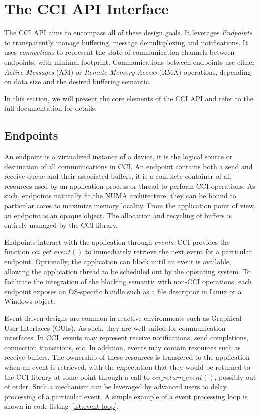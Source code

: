 \section{The CCI API Interface}
\label{sec:interface}

The CCI API aims to encompass all of these design goals. It leverages \emph{Endpoints} to transparently manage buffering, message demultiplexing and notifications. It uses \emph{connections} to represent the state of communication channels between endpoints, with minimal footprint. Communications between endpoints use either \emph{Active Messages} (AM) or \emph{Remote Memory Access} (RMA) operations, depending on data size and the desired buffering semantic. 

In this section, we will present the core elements of the CCI API and refer to the full documentation\cite{cci-api} for details.

\subsection{Endpoints}
An endpoint is a virtualized instance of a device, it is the logical source 
or destination of all communications in CCI. An endpoint contains both a send 
and receive queue and their associated buffers, it is a complete container 
of all resources used by an application process or thread to perform CCI 
operations. As such, endpoints naturally fit the NUMA architecture, they can 
be bound to particular cores to maximize memory locality. From the application 
point of view, an endpoint is an opaque object. The allocation and recycling 
of buffers is entirely managed by the CCI library.

Endpoints interact with the application through \emph{events}. CCI provides the function $cci\_get\_event()$ to immediately retrieve the next event for a particular endpoint. Optionally, the application can block until an event is available, allowing the application thread to be scheduled out by the operating system. To facilitate the integration of the blocking semantic with non-CCI operations, each endpoint exposes an OS-specific handle such as a file descriptor in Linux or a Windows object. 

Event-driven designs are common in reactive environments such as Graphical User  Interfaces (GUIs). As such, they are well suited for communication interfaces. In CCI, events may represent receive notifications, send completions, connection transitions, etc. In addition, events may contain resources such as receive buffers. The ownership of these resources is transfered to the application when an event is retrieved, with the expectation that they would be returned to the CCI library at some point through a call to $cci\_return\_event()$, possibly out of order. Such a mechanism can be leveraged by advanced users to delay processing of a particular event. A simple example of a event processing loop is shown in code listing~\ref{lst:event-loop}.

